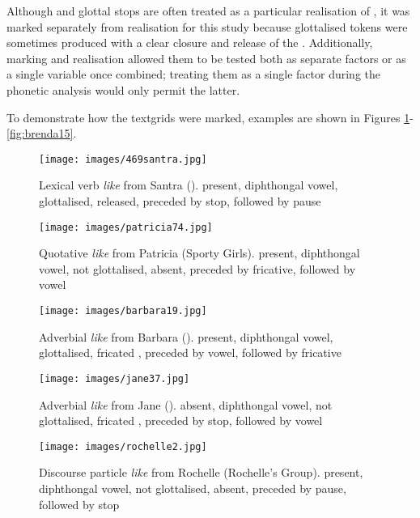 \noindent Although  and glottal stops are often treated as a particular realisation of  \citep{lavoie2002}, it was marked separately from  realisation for this study because glottalised tokens were sometimes produced with a clear closure and release of the . Additionally, marking  and  realisation allowed them to be tested both as separate factors or as a single variable once combined; treating them as a single factor during the phonetic analysis would only permit the latter. 

To demonstrate how the textgrids were marked, examples are shown in Figures \ref{fig:469santra}-\ref{fig:brenda15}.

\begin{figure}[p]
	\centering
		\texttt{[image: images/469santra.jpg]}
		\caption{Lexical verb \textit{like} from Santra ().  present, diph\-thongal vowel, glottalised,  released, preceded by stop, followed by pause} 
	\label{fig:469santra}
\end{figure}

\begin{figure}[p]
	\centering
		\texttt{[image: images/patricia74.jpg]}
	\caption{Quotative \textit{like} from Patricia (Sporty Girls).  present, diph\-thongal vowel, not glottalised,  absent, preceded by fricative, followed by vowel}
	\label{fig:patricia74}
\end{figure}

\begin{figure}[p]
	\centering
		\texttt{[image: images/barbara19.jpg]}
	\caption{Adverbial \textit{like} from Barbara ().  pre\-sent, diph\-thongal vowel, glottalised, fricated , preceded by vowel, followed by fricative}
	\label{fig:barbara19}
\end{figure}

\begin{figure}[p]
	\centering
		\texttt{[image: images/jane37.jpg]}
	\caption{Adverbial \textit{like} from Jane ().  absent, diphthongal vowel, not glottalised, fricated , preceded by stop, followed by vowel}
	\label{fig:jane37}
\end{figure}

\begin{figure}[p]
	\centering
		\texttt{[image: images/rochelle2.jpg]}
	\caption{Discourse particle \textit{like} from Rochelle (Rochelle's Group).  present, diphthongal vowel, not glottalised,  absent, preceded by pause, followed by stop}
	\label{fig:rochelle2}
\end{figure}


